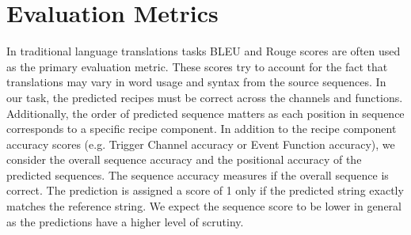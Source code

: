 \documentclass[letterpaper]{article} %
\begin{document}
\begin{table}
\centering
{}
\caption{Model performance on IFTTT recipes.}
\label{tab:ifttt_results}
\end{table}

\section{Evaluation Metrics}

In traditional language translations tasks BLEU and Rouge scores are often used as the primary evaluation metric. These scores try to account for the fact that translations may vary in word usage and syntax from the source sequences. In our task, the predicted recipes must be correct across the channels and functions. Additionally, the order of predicted sequence matters as each position in sequence corresponds to a specific recipe component.  In addition to the recipe component accuracy scores (e.g. Trigger Channel accuracy or Event Function accuracy), we consider the overall sequence accuracy and the positional accuracy of the predicted sequences. The sequence accuracy measures if the overall sequence is correct. The prediction is assigned a score of 1 only if the predicted string exactly matches the reference string. We expect the sequence score to be lower in general as the predictions have a higher level of scrutiny.
\end{document}
